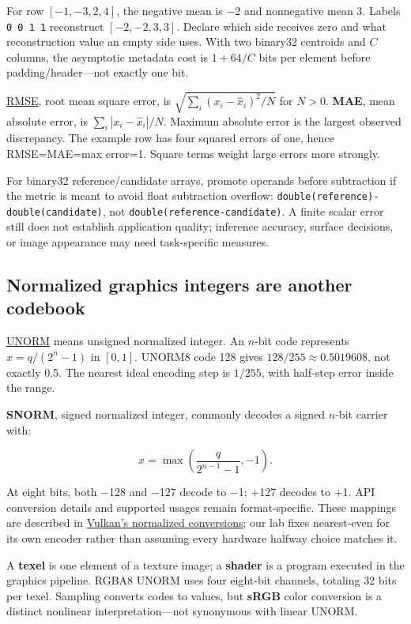 For row \([-1,-3,2,4]\), the negative mean is −2 and nonnegative mean 3. Labels \texttt{0\ 0\ 1\ 1} reconstruct \([-2,-2,3,3]\). Declare which side receives zero and what reconstruction value an empty side uses. With two binary32 centroids and \(C\) columns, the asymptotic metadata cost is \(1+64/C\) bits per element before padding/header---not exactly one bit.

\hyperref[appendix-537171d69d27]{RMSE}, root mean square error, is \(\sqrt{\sum_i(x_i-\widehat x_i)^2/N}\) for \(N>0\). \textbf{MAE}, mean absolute error, is \(\sum_i|x_i-\widehat x_i|/N\). Maximum absolute error is the largest observed discrepancy. The example row has four squared errors of one, hence RMSE=MAE=max error=1. Square terms weight large errors more strongly.

For binary32 reference/candidate arrays, promote operands before subtraction if the metric is meant to avoid float subtraction overflow: \texttt{double(reference)-double(candidate)}, not \texttt{double(reference-candidate)}. A finite scalar error still does not establish application quality; inference accuracy, surface decisions, or image appearance may need task-specific measures.

\subsection{Normalized graphics integers are another codebook}\label{01-foundations-i-ch001-normalized-graphics-integers-are-another-codebook}

\hyperref[appendix-b2402c453dac]{UNORM} means unsigned normalized integer. An \(n\)-bit code represents \(x=q/(2^n-1)\) in \([0,1]\). UNORM8 code 128 gives \(128/255\approx0.5019608\), not exactly 0.5. The nearest ideal encoding step is \(1/255\), with half-step error inside the range.

\textbf{SNORM}, signed normalized integer, commonly decodes a signed \(n\)-bit carrier with:

\[
x=\max\!\left(\frac{q}{2^{n-1}-1},-1\right).
\]

At eight bits, both −128 and −127 decode to −1; +127 decodes to +1. API conversion details and supported usages remain format-specific. These mappings are described in \href{https://docs.vulkan.org/spec/latest/chapters/fundamentals.html\#fundamentals-fixedfpconv}{Vulkan's normalized conversions}; our lab fixes nearest-even for its own encoder rather than assuming every hardware halfway choice matches it.

A \textbf{texel} is one element of a texture image; a \textbf{shader} is a program executed in the graphics pipeline. RGBA8 UNORM uses four eight-bit channels, totaling 32 bits per texel. Sampling converts codes to values, but \textbf{sRGB} color conversion is a distinct nonlinear interpretation---not synonymous with linear UNORM.

